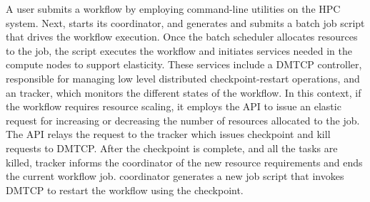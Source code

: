 A user submits a workflow by employing  \systemname command-line utilities
on the HPC system. Next, \systemname starts its coordinator, 
and generates and submits a batch job script that drives
the workflow execution. Once the batch scheduler allocates resources to the job,
the script executes the workflow and initiates services needed in the compute
nodes to support elasticity. These services include a DMTCP controller, responsible
for managing low level distributed checkpoint-restart operations, and an \systemname
tracker, which monitors the different states of the workflow. In this context, if
the workflow requires resource scaling, it employs the \systemname API to issue an
elastic request for increasing or decreasing the number of resources allocated to
the job. The \systemname API relays the request to the \systemname tracker which
issues checkpoint and kill requests to DMTCP. After the checkpoint is complete,
and all the tasks are killed, \systemname tracker informs the coordinator of the
new resource requirements and ends the current workflow job. \systemname coordinator
generates a new job script that invokes DMTCP to restart the workflow using the checkpoint.


\vspace{-0.3cm}
